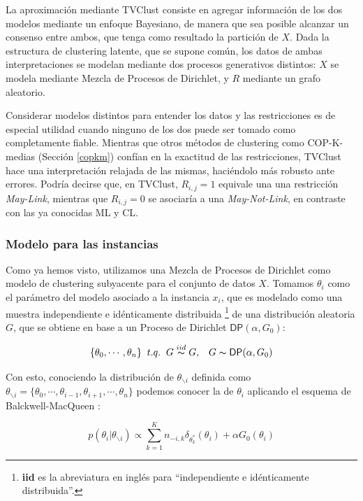 La aproximación mediante \acs{TVClust} consiste en agregar información de los dos modelos mediante un enfoque Bayesiano, de manera que sea posible alcanzar un consenso entre ambos, que tenga como resultado la partición de $X$. Dada la estructura de clustering latente, que se supone común, los datos de ambas interpretaciones se modelan mediante dos procesos generativos distintos: $X$ se modela mediante Mezcla de Procesos de Dirichlet, y $R$ mediante un grafo aleatorio.

Considerar modelos distintos para entender los datos y las restricciones es de especial utilidad cuando ninguno de los dos puede ser tomado como completamente fiable. Mientras que otros métodos de clustering como COP-K-medias (Sección \ref{copkm}) confían en la exactitud de las restricciones, \acs{TVClust} hace una interpretación relajada de las mismas, haciéndolo más robusto ante errores. Podría decirse que, en \acs{TVClust}, $R_{i,j} = 1$ equivale una una restricción \textit{May-Link}, mientras que $R_{i,j} = 0$ se asociaría a una \textit{May-Not-Link}, en contraste con las ya conocidas \acf{ML} y \acf{CL}.

\subsubsection{Modelo para las instancias}

Como ya hemos visto, utilizamos una Mezcla de Procesos de Dirichlet como modelo de clustering subyacente para el conjunto de datos $X$. Tomamos $\theta_i$ como el parámetro del modelo asociado
a la instancia $x_i$, que es modelado como una muestra independiente e idénticamente distribuida \footnote{\textbf{iid} es la abreviatura en inglés para ``independiente e idénticamente distribuida''.} de una distribución aleatoria $G$, que se obtiene en base a un Proceso de Dirichlet $\mathsf{DP}(\alpha, G_0)$:

\begin{equation}
\{\theta_0, \cdots, \theta_n\} \;\; t.q. \;\; G \overset{iid}{\thicksim} G, \;\;\; G \thicksim \mathsf{DP}(\alpha, G_0)
\label{eqn44}
\end{equation}

Con esto, conociendo la distribución de $\theta_{\backslash i}$ definida como $\theta_{\backslash i} = \{\theta_0, \cdots, \theta_{i-1},\theta_{i+1}, \cdots,\theta_n\}$ podemos conocer la de $\theta_{i}$ aplicando el esquema de Balckwell-MacQueen \cite{Blackwell:1973}:

\begin{equation}
p(\theta_{i}|\theta_{\backslash i}) \varpropto \sum_{k = 1}^{K} n_{-i,k} \delta_{\theta_{k}^*}(\theta_{i}) + \alpha G_0(\theta_{i})
\label{eqn45}
\end{equation}

